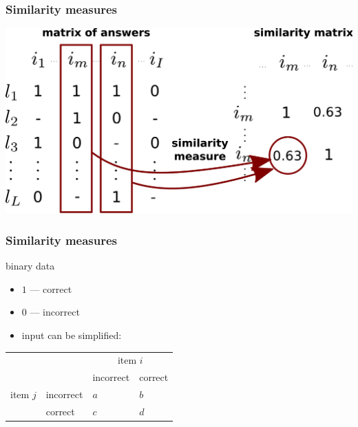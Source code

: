\documentclass[xcolor=svgnames]{beamer}
\begin{document}
\begin{frame}
    \frametitle{Similarity measures}
    \centering
    \includegraphics[width=.9\linewidth]{figures/diagram-first-step}
\end{frame}
\begin{frame}
    \frametitle{Similarity measures}

    binary data
    \begin{itemize}
        \item $1$ --- correct
        \item $0$ --- incorrect
        \item input can be simplified:
    \end{itemize}

    \vfill

    \centering
    \begin{tabular}{llll}
        \toprule
        & & \multicolumn{2}{c}{item $i$} \\
        & & incorrect & correct \\
        \midrule
        item $j$ & incorrect & $a$ & $b$ \\
        & correct & $c$ & $d$ \\
        \bottomrule
    \end{tabular}
\end{frame}
\end{document}

